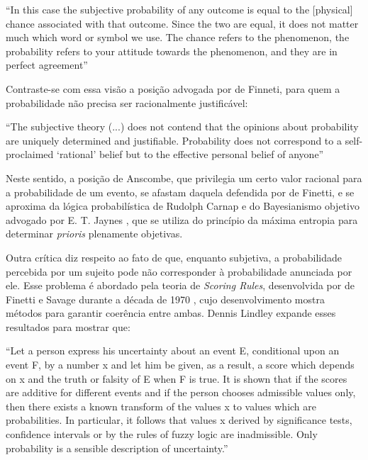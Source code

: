 ``In this case the subjective probability of any outcome is equal to the [physical] chance associated with that outcome.
Since the two are equal, it does not matter much which word or symbol we use. The
chance refers to the phenomenon, the probability refers to your attitude
towards the phenomenon, and they are in perfect agreement''\citep{Anscombe63}

Contraste-se com essa visão a posição advogada por de Finneti, para quem a probabilidade não precisa ser racionalmente
justificável:

``The subjective theory (...) does not contend that the opinions about probability are uniquely determined and
justifiable. Probability does not correspond to a self-proclaimed `rational' belief but to the effective personal
belief of anyone''\citep{deFinetti51}

Neste sentido, a posição de Anscombe, que privilegia um certo valor racional para a probabilidade de um evento,
se afastam daquela defendida por de Finetti, e se aproxima da lógica probabilística de Rudolph Carnap e do Bayesianismo
objetivo advogado por E. T. Jaynes \citep{Jaynes68}, que se utiliza do princípio da máxima entropia para determinar
{\em prioris} plenamente objetivas.

Outra crítica diz respeito ao fato de que, enquanto subjetiva, a probabilidade percebida por um sujeito pode não corresponder
à probabilidade anunciada por ele. Esse problema é abordado pela teoria de {\em Scoring Rules}, desenvolvida por
de Finetti e Savage durante a década de 1970 \citep{Lindley82}, cujo
desenvolvimento mostra métodos para garantir coerência entre ambas. Dennis Lindley expande esses resultados para mostrar que:

``Let a person express his uncertainty about an event E, conditional upon an event F, by a number x and let him be given, 
as a result, a score which depends on x and the truth or falsity of E when F is true. It is shown that if the scores are 
additive for different events and if the person chooses admissible values only, then there exists a known transform of the 
values x to values which are probabilities. In particular, it follows that values x derived by significance tests, confidence 
intervals or by the rules of fuzzy logic are inadmissible. Only probability is a sensible description of uncertainty.''
\citep{Lindley82}

